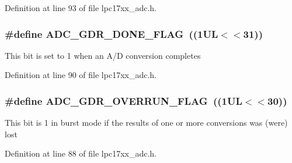 \-Definition at line 93 of file lpc17xx\-\_\-adc.\-h.

\hypertarget{group___a_d_c___private___macros_ga10e152dba4ccc21a6ea94a2481c51d92}{
\subsubsection[{\-A\-D\-C\-\_\-\-G\-D\-R\-\_\-\-D\-O\-N\-E\-\_\-\-F\-L\-A\-G}]{\setlength{\rightskip}{0pt plus 5cm}\#define {\bf \-A\-D\-C\-\_\-\-G\-D\-R\-\_\-\-D\-O\-N\-E\-\_\-\-F\-L\-A\-G}~((1\-U\-L$<$$<$31))}}\label{group___a_d_c___private___macros_ga10e152dba4ccc21a6ea94a2481c51d92}
\-This bit is set to 1 when an \-A/\-D conversion completes 

\-Definition at line 90 of file lpc17xx\-\_\-adc.\-h.

\hypertarget{group___a_d_c___private___macros_ga58a2d5a6e2743223c42a06d3f842d2cc}{
\subsubsection[{\-A\-D\-C\-\_\-\-G\-D\-R\-\_\-\-O\-V\-E\-R\-R\-U\-N\-\_\-\-F\-L\-A\-G}]{\setlength{\rightskip}{0pt plus 5cm}\#define {\bf \-A\-D\-C\-\_\-\-G\-D\-R\-\_\-\-O\-V\-E\-R\-R\-U\-N\-\_\-\-F\-L\-A\-G}~((1\-U\-L$<$$<$30))}}\label{group___a_d_c___private___macros_ga58a2d5a6e2743223c42a06d3f842d2cc}
\-This bit is 1 in burst mode if the results of one or more conversions was (were) lost 

\-Definition at line 88 of file lpc17xx\-\_\-adc.\-h.

